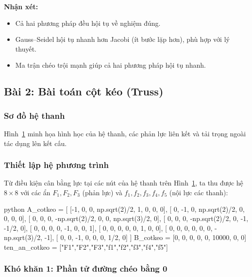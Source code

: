 \documentclass[12pt,a4paper]{article}
\begin{document}
\textbf{Nhận xét:}
\begin{itemize}
    \item Cả hai phương pháp đều hội tụ về nghiệm đúng.
    \item Gauss--Seidel hội tụ nhanh hơn Jacobi (ít bước lặp hơn), phù hợp với lý thuyết.
    \item Ma trận chéo trội mạnh giúp cả hai phương pháp hội tụ nhanh.
\end{itemize}

\subsection{Bài 2: Bài toán cột kéo (Truss)}

\subsubsection{Sơ đồ hệ thanh}

Hình~\ref{fig:truss} minh họa hình học của hệ thanh, các phản lực liên kết và tải trọng ngoài tác dụng lên kết cấu.

\begin{figure}[H]
    \centering
    
    \label{fig:truss}
\end{figure}

\subsubsection{Thiết lập hệ phương trình}

Từ điều kiện cân bằng lực tại các nút của hệ thanh trên Hình~\ref{fig:truss}, ta thu được hệ $8\times 8$ với các ẩn $F_1, F_2, F_3$ (phản lực) và $f_1, f_2, f_3, f_4, f_5$ (nội lực các thanh):

\begin{mintedbox}{python}
A_cotkeo = [
    [-1,  0,  0,  np.sqrt(2)/2,  1,  0,  0,  0],
    [ 0, -1,  0,  np.sqrt(2)/2,  0,  0,  0,  0],
    [ 0,  0,  0, -np.sqrt(2)/2,  0,  0,  np.sqrt(3)/2,  0],
    [ 0,  0,  0, -np.sqrt(2)/2,  0, -1, -1/2,  0],
    [ 0,  0,  0,  0, -1,  0,  0,  1],
    [ 0,  0,  0,  0,  0,  1,  0,  0],
    [ 0,  0,  0,  0,  0,  0, -np.sqrt(3)/2, -1],
    [ 0,  0, -1,  0,  0,  0,  1/2,  0]
]
B_cotkeo = [0, 0, 0, 0, 0, 10000, 0, 0]
ten_an_cotkeo = ["F1","F2","F3","f1","f2","f3","f4","f5"]
\end{mintedbox}

\subsubsection{Khó khăn 1: Phần tử đường chéo bằng 0}
\end{document}
